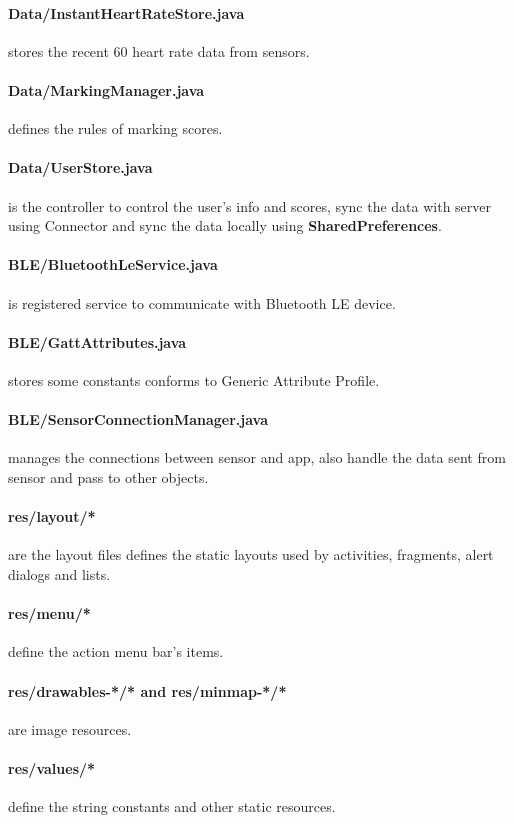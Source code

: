 \documentclass[10pt,a4paper,final]{scrartcl}
\begin{document}
\paragraph{Data/InstantHeartRateStore.java} stores the recent 60 heart rate data from sensors.
\paragraph{Data/MarkingManager.java} defines the rules of marking scores.
\paragraph{Data/UserStore.java} is the controller to control the user's info and scores, sync the data with server using Connector and sync the data locally using {\bf SharedPreferences}.
\paragraph{BLE/BluetoothLeService.java} is registered service to communicate with Bluetooth LE device.
\paragraph{BLE/GattAttributes.java} stores some constants conforms to Generic Attribute Profile.
\paragraph{BLE/SensorConnectionManager.java} manages the connections between sensor and app, also handle the data sent from sensor and pass to other objects.


\paragraph{res/layout/*} are the layout files defines the static layouts used by activities, fragments, alert dialogs and lists.
\paragraph{res/menu/*} define the action menu bar's items.
\paragraph{res/drawables-*/* and res/minmap-*/*} are image resources.
\paragraph{res/values/*} define the string constants and other static resources.
\end{document}
